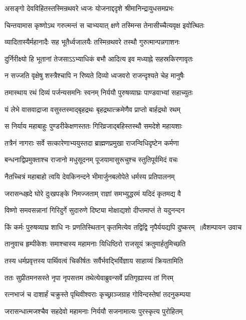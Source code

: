 \twolineshloka
{असङ्गो देवविहितस्तस्मिन्रथवरे ध्वजः}
{योजनाद्ददृशे श्रीमानिन्द्रायुधसमप्रभः}


\twolineshloka
{चिन्तयामास कृष्णोऽथ गरुत्मन्तं स चाभ्ययात्}
{क्षणे तस्मिन्स तेनासीच्चैत्यवृक्ष इवोत्थितः}


\twolineshloka
{व्यादितास्यैर्महानादैः सह भूतैर्ध्वजालयैः}
{तस्मिन्रथवरे तस्थौ गुरुत्मान्पन्नगाशनः}


\twolineshloka
{दुर्निरीक्ष्यो हि भूतानां तेजसाऽऽभ्याधिकं बभौ}
{आदित्य इव मध्याह्ने सहस्रकिरणावृतः}


\twolineshloka
{न सज्जति वृक्षेषु शस्त्रैश्चापि न रिष्यते}
{दिव्यो ध्वजवरो राजन्दृश्यते चेह मानुषैः}


\twolineshloka
{तमास्थाय रथं दिव्यं पर्जन्यसमनिः स्वनम्}
{निर्ययौ पुरुषव्याघ्रः पाण्डवाभ्यां सहाच्युतः}


\twolineshloka
{यं लेभे वासवाद्राजा वसुस्तस्माद्बृहद्रथः}
{बृहद्रथात्क्रमेणैव प्राप्तो बार्हद्रथो रथम्}


\twolineshloka
{स निर्याय महाबाहुः पुण्डरीकेक्षणस्ततः}
{गिरिव्रजाद्बहिस्तस्थौ समदेशे महायशाः}


\twolineshloka
{तत्रैनं नागराः सर्वे सत्कारेणाभ्ययुस्तदा}
{ब्राह्मणप्रमुखा राजन्विधिदृष्टेन कर्मणा}


\twolineshloka
{बन्धनाद्विप्रमुक्ताश्च राजानो मधुसूदनम्}
{पूजयामासुरूचुश्च स्तुतिपूर्वमिदं वचः}


\twolineshloka
{नैतच्चित्रं महाबाहो त्वयि देवकिनन्दने}
{भीमार्जुनबलोपेते धर्मस्य प्रतिपालनम्}


\twolineshloka
{जरासन्धह्रदे घोरे दुःखपङ्के निमज्जताम्}
{राज्ञां समभ्युद्धरमं यदिदं कृतमद्य वै}


\twolineshloka
{विष्णो समवसन्नानां गिरिदुर्गे सुदारुणे}
{दिष्ट्या मोक्षाद्यशो दीप्तमाप्तं ते यदुनन्दन}


\twolineshloka
{किं कर्मः पुरुषव्याघ्र शाधि नः प्रणतिस्थितान्}
{कृतमित्येव तद्विद्वि नृपैर्ययद्यपि दुष्करम् ॥वैशम्पायन उवाच}


\twolineshloka
{तानुवाच हृम्पीकेशः समाश्चास्य महामनाः}
{यिधिष्ठिरो राजसूयं क्रतुमार्हतुमिच्छति}


\twolineshloka
{तस्य धर्मप्रवृत्तस्य पार्थिवत्वं चिकीर्षतः}
{सर्वैर्भवद्भिर्विज्ञाय साहाय्यं क्रियतामिति}


\twolineshloka
{ततः सुप्रीतमनसस्ते नृपा नृपसत्तम}
{तथेत्येवाब्रुवन्सर्वे प्रतिगृह्यास्य तां गिरम्}


\twolineshloka
{रत्नभाजं च दाशार्हं चक्रुस्ते पृथिवीश्वराः}
{कृच्छ्राञ्जग्राह गोविन्दस्तेषां तदनुकम्पया}


\twolineshloka
{जरासन्धात्मजश्चैव सहदेवो महामनाः}
{निर्ययौ सजनामात्यः पुरस्कृत्य पुरोहितम्}


